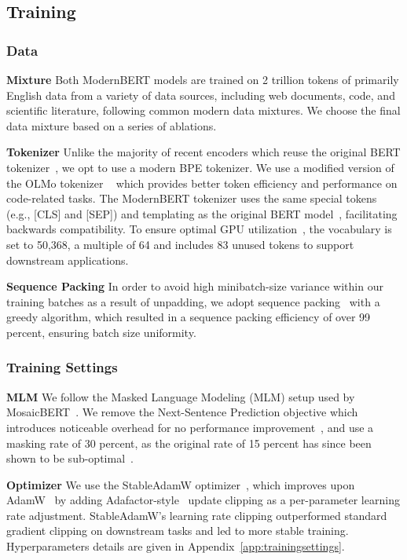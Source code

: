 \documentclass[11pt]{article}
\begin{document}
\subsection{Training}

\subsubsection{Data}
\textbf{Mixture} Both ModernBERT models are trained on 2 trillion tokens of primarily English data from a variety of data sources, including web documents, code, and scientific literature, following common modern data mixtures. We choose the final data mixture based on a series of ablations.

\textbf{Tokenizer} Unlike the majority of recent encoders which reuse the original BERT tokenizer~\cite{nomic,mosaic,gte}, we opt to use a modern BPE tokenizer. We use a modified version of the OLMo tokenizer ~\cite{olmo} which provides better token efficiency and performance on code-related tasks. The ModernBERT tokenizer uses the same special tokens (e.g., \textsc{[CLS]} and \textsc{[SEP]}) and templating as the original BERT model~\cite{bert}, facilitating backwards compatibility. To ensure optimal GPU utilization~\cite{codesigning,karpathy}, the vocabulary is set to 50,368, a multiple of 64 and includes 83 unused tokens to support downstream applications.

\textbf{Sequence Packing} In order to avoid high minibatch-size variance within our training batches as a result of unpadding, we adopt sequence packing~\cite{t5,seqpack} with a greedy algorithm, which resulted in a sequence packing efficiency of over 99 percent, ensuring batch size uniformity.

\subsubsection{Training Settings}
\label{subsubsec:trainingsetting}
\textbf{MLM} We follow the Masked Language Modeling (MLM) setup used by MosaicBERT~\cite{mosaic}. We remove the Next-Sentence Prediction objective which introduces noticeable overhead for no performance improvement~\cite{roberta,academicbudget}, and use a masking rate of 30 percent, as the original rate of 15 percent has since been shown to be sub-optimal~\cite{mask15maskedlanguage}.

\textbf{Optimizer} We use the StableAdamW optimizer~\cite{stableladamw}, which improves upon AdamW~\cite{adamw} by adding Adafactor-style~\cite{adafactor} update clipping as a per-parameter learning rate adjustment. StableAdamW's learning rate clipping outperformed standard gradient clipping on downstream tasks and led to more stable training. Hyperparameters details are given in Appendix~\ref{app:trainingsettings}.
\end{document}
